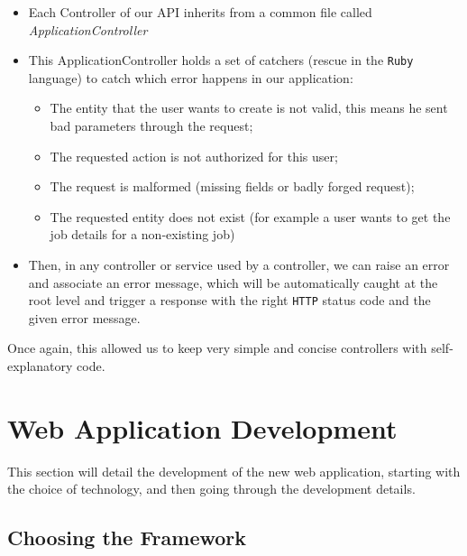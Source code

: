 \documentclass{eplmastersthesis}
\begin{document}
          \begin{itemize}
            \item Each Controller of our API inherits from a common file
            called \textit{ApplicationController}
            \item This ApplicationController holds a set of catchers (rescue
            in the \texttt{Ruby} language) to catch which error happens in our
            application:

              \begin{itemize}
                \item The entity that the user wants to create is not valid,
                this means he sent bad parameters through the request;
                \item The requested action is not authorized for this user;
                \item The request is malformed (missing fields or badly forged
                request);
                \item The requested entity does not exist (for example a user
                wants to get the job details for a non-existing job)
              \end{itemize}

            \item Then, in any controller or service used by a controller, we
            can raise an error and associate an error message, which will be
            automatically caught at the root level and trigger a response with
            the right \texttt{HTTP} status code and the given error message.
          \end{itemize}

        Once again, this allowed us to keep very simple and concise
        controllers with self-explanatory code.

    \section{Web Application Development}

      This section will detail the development of the new web application,
      starting with the choice of technology, and then going through the
      development details.

      \subsection{Choosing the Framework}
\end{document}
